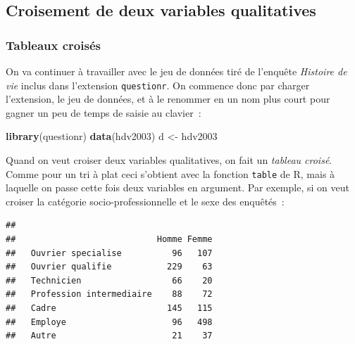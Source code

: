 \documentclass[12pt,]{book}
\newenvironment{Shaded}{\begin{snugshade}}{\end{snugshade}}
\newcommand{\KeywordTok}[1]{\textcolor[rgb]{0.27,0.27,0.27}{\textbf{#1}}}
\newcommand{\NormalTok}[1]{#1}
\newcommand{\OperatorTok}[1]{\textcolor[rgb]{0.43,0.43,0.43}{\textbf{#1}}}
\newcommand{\StringTok}[1]{\textcolor[rgb]{0.5,0.5,0.5}{#1}}
\begin{document}
\hypertarget{croisement-de-deux-variables-qualitatives}{%
\subsection{Croisement de deux variables qualitatives}\label{croisement-de-deux-variables-qualitatives}}

\hypertarget{tableaux-croisuxe9s}{%
\subsubsection{Tableaux croisés}\label{tableaux-croisuxe9s}}

On va continuer à travailler avec le jeu de données tiré de l'enquête \emph{Histoire de vie} inclus dans l'extension \texttt{questionr}. On commence donc par charger l'extension, le jeu de données, et à le renommer en un nom plus court pour gagner un peu de temps de saisie au clavier~:

\begin{Shaded}
\begin{Highlighting}[]
\KeywordTok{library}\NormalTok{(questionr)}
\KeywordTok{data}\NormalTok{(hdv2003)}
\NormalTok{d <-}\StringTok{ }\NormalTok{hdv2003}
\end{Highlighting}
\end{Shaded}

Quand on veut croiser deux variables qualitatives, on fait un \emph{tableau croisé}. Comme pour un tri à plat ceci s'obtient avec la fonction \texttt{table} de R, mais à laquelle on passe cette fois deux variables en argument. Par exemple, si on veut croiser la catégorie socio-professionnelle et le sexe des enquêtés~:

\begin{Shaded}
\end{Shaded}

\begin{verbatim}
##                           
##                            Homme Femme
##   Ouvrier specialise          96   107
##   Ouvrier qualifie           229    63
##   Technicien                  66    20
##   Profession intermediaire    88    72
##   Cadre                      145   115
##   Employe                     96   498
##   Autre                       21    37
\end{verbatim}
\end{document}
